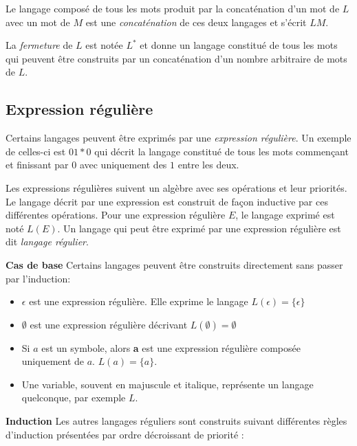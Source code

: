 Le langage composé de tous les mots produit par la concaténation d'un mot de $L$ avec un mot de $M$ est une \emph{concaténation} de ces deux langages et s'écrit $LM$.

La \emph{fermeture} de $L$ est notée $L^*$ et donne un langage constitué de tous les mots qui peuvent être construits par un concaténation d'un nombre arbitraire de mots de $L$.

\subsection{Expression régulière}\label{ss:regex}

Certains langages peuvent être exprimés par une \emph{expression régulière}. Un exemple de celles-ci est $01*0$ qui décrit la langage constitué de tous les mots commençant et finissant par $0$ avec uniquement des $1$ entre les deux.

Les expressions régulières suivent un algèbre avec ses opérations et leur priorités. Le langage décrit par une expression est construit de façon inductive par ces différentes opérations. Pour une expression régulière $E$, le langage exprimé est noté $L(E)$. Un langage qui peut être exprimé par une expression régulière est dit \emph{langage régulier}.


\textbf{Cas de base}
Certains langages peuvent être construits directement sans passer par l'induction:

\begin{itemize}
	\item $\epsilon$ est une expression régulière. Elle exprime le langage $L(\epsilon)=\{\epsilon\}$
	\item $\emptyset$ est une expression régulière décrivant $L(\emptyset)=\emptyset$
	\item Si $a$ est un symbole, alors \textbf{a} est une expression régulière composée uniquement de $a$. $L(a) = \{a\}$.
	\item Une variable, souvent en majuscule et italique, représente un langage quelconque, par exemple $L$.
\end{itemize}


\textbf{Induction}
Les autres langages réguliers sont construits suivant différentes règles d'induction présentées par ordre décroissant de priorité :

